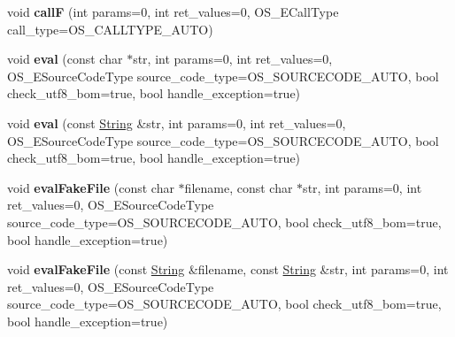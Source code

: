 \begin{DoxyCompactItemize}
\item 
void {\bfseries callF} (int params=0, int ret\+\_\+values=0, O\+S\+\_\+\+E\+Call\+Type call\+\_\+type=O\+S\+\_\+\+C\+A\+L\+L\+T\+Y\+P\+E\+\_\+\+A\+U\+TO)\hypertarget{class_object_script_1_1_o_s_a9df3cba3bc6f07802cffea77de5be215}{}\label{class_object_script_1_1_o_s_a9df3cba3bc6f07802cffea77de5be215}

\item 
void {\bfseries eval} (const char $\ast$str, int params=0, int ret\+\_\+values=0, O\+S\+\_\+\+E\+Source\+Code\+Type source\+\_\+code\+\_\+type=O\+S\+\_\+\+S\+O\+U\+R\+C\+E\+C\+O\+D\+E\+\_\+\+A\+U\+TO, bool check\+\_\+utf8\+\_\+bom=true, bool handle\+\_\+exception=true)\hypertarget{class_object_script_1_1_o_s_abef78af9dffb089e308d37f431a93b2a}{}\label{class_object_script_1_1_o_s_abef78af9dffb089e308d37f431a93b2a}

\item 
void {\bfseries eval} (const \hyperlink{class_object_script_1_1_o_s_1_1_string}{String} \&str, int params=0, int ret\+\_\+values=0, O\+S\+\_\+\+E\+Source\+Code\+Type source\+\_\+code\+\_\+type=O\+S\+\_\+\+S\+O\+U\+R\+C\+E\+C\+O\+D\+E\+\_\+\+A\+U\+TO, bool check\+\_\+utf8\+\_\+bom=true, bool handle\+\_\+exception=true)\hypertarget{class_object_script_1_1_o_s_a8048d37e2419289413dffaa007ead081}{}\label{class_object_script_1_1_o_s_a8048d37e2419289413dffaa007ead081}

\item 
void {\bfseries eval\+Fake\+File} (const char $\ast$filename, const char $\ast$str, int params=0, int ret\+\_\+values=0, O\+S\+\_\+\+E\+Source\+Code\+Type source\+\_\+code\+\_\+type=O\+S\+\_\+\+S\+O\+U\+R\+C\+E\+C\+O\+D\+E\+\_\+\+A\+U\+TO, bool check\+\_\+utf8\+\_\+bom=true, bool handle\+\_\+exception=true)\hypertarget{class_object_script_1_1_o_s_abc0334d3eeb74c3190a39de4c05d047e}{}\label{class_object_script_1_1_o_s_abc0334d3eeb74c3190a39de4c05d047e}

\item 
void {\bfseries eval\+Fake\+File} (const \hyperlink{class_object_script_1_1_o_s_1_1_string}{String} \&filename, const \hyperlink{class_object_script_1_1_o_s_1_1_string}{String} \&str, int params=0, int ret\+\_\+values=0, O\+S\+\_\+\+E\+Source\+Code\+Type source\+\_\+code\+\_\+type=O\+S\+\_\+\+S\+O\+U\+R\+C\+E\+C\+O\+D\+E\+\_\+\+A\+U\+TO, bool check\+\_\+utf8\+\_\+bom=true, bool handle\+\_\+exception=true)\hypertarget{class_object_script_1_1_o_s_a4a64a3590829f04059d986ce5c96cfb0}{}\label{class_object_script_1_1_o_s_a4a64a3590829f04059d986ce5c96cfb0}


\end{DoxyCompactItemize}
